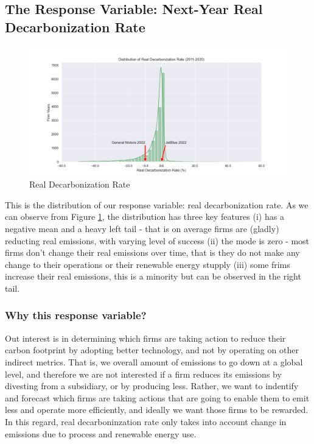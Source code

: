 \subsection{The Response Variable: Next-Year Real Decarbonization Rate}

\begin{figure}[H]
    \begin{center}
    \includegraphics[width=5in]{figures/ghg_change_real_dist.png}
    \caption{Real Decarbonization Rate}
    \label{fig:next-year-real-decarbonization-rate}
    \end{center}
\end{figure}

\noindent This is the distribution of our response variable: real decarbonization rate. As we can observe from Figure \ref{fig:next-year-real-decarbonization-rate}, the distribution has three key features (i) has a negative mean and a heavy left tail - that is on average firms are (gladly) reducting real emissions, with varying level of success (ii) the mode is zero - most firms don't change their real emissions over time, that is they do not make any change to their operations or their renewable energy stupply (iii) some frims increase their real emissions, this is a minority but can be observed in the right tail. 

\subsubsection{Why this response variable?}
Out interest is in determining which firms are taking action to reduce their carbon footprint by adopting better technology, and not by operating on other indirect metrics. That is, we overall amount of emissions to go down at a global level, and therefore we are not interested if a firm reduces its emissions by divesting from a subsidiary, or by producing less. Rather, we want to indentify and forecast which firms are taking actions that are going to enable them to emit less and operate more efficiently, and ideally we want those firms to be rewarded. In this regard, real decarboninzation rate only takes into account change in emissions due to process and renewable energy use. 

